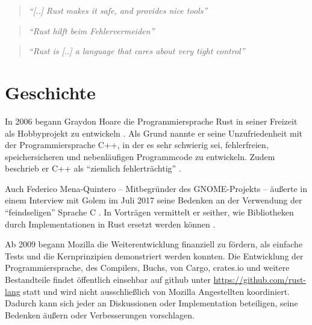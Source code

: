 \begin{quotation}
	\textit{\enquote{[..] Rust makes it safe, and  provides nice tools}} 
	\cite[Folie 130, Federico Mena-Quintero in \enquote{Ersetzen von C Bibliotheken durch Rust}]{rust:c_is_hostile_mena}
\end{quotation}

\begin{quotation}
	\textit{\enquote{Rust hilft beim Fehlervermeiden}} 
	\cite[Federico Mena-Quintero in einem Interview]{rust:c_is_hostile_golem}
\end{quotation}

\begin{quotation}
	\textit{\enquote{Rust is [..] a language that cares about very tight control}}
	\cite[Diskussion zwischen Programmierern auf Reddit]{rust:tight_control}
\end{quotation}


\clearpage
\section{Geschichte}
\label{rust:history}

In 2006 begann Graydon Hoare die Programmiersprache Rust in seiner Freizeit als Hobbyprojekt zu entwickeln \cite{rust:faq}.
Als Grund nannte er seine Unzufriedenheit mit der Programmiersprache C++, in der es sehr schwierig sei, fehlerfreien, speichersicheren und nebenläufigen Programmcode zu entwickeln.
Zudem beschrieb er C++ als \enquote{ziemlich fehlerträchtig} \cite{rust:heise_interview_graydon}.

Auch Federico Mena-Quintero -- Mitbegründer des GNOME-Projekts \cite{rust:gnome:federico}  --
äußerte in einem Interview mit Golem im Juli 2017 seine Bedenken an der Verwendung der \enquote{feindseligen} Sprache C \cite{rust:c_is_hostile_golem}.
In Vorträgen  vermittelt er seither, wie Bibliotheken durch Implementationen in Rust ersetzt werden können \cite{rust:c_is_hostile_mena}.

Ab 2009 begann Mozilla die Weiterentwicklung finanziell zu fördern, als einfache Tests und die Kernprinzipien demonstriert werden konnten.
Die Entwicklung der Programmiersprache, des Compilers, Buchs, von Cargo, crates.io und weitere Bestandteile findet öffentlich einsehbar auf \gls{github}  unter \url{https://github.com/rust-lang} statt und wird nicht ausschließlich von Mozilla Angestellten koordiniert.
Dadurch kann sich jeder an Diskussionen oder Implementation beteiligen, seine Bedenken äußern oder Verbesserungen vorschlagen.

